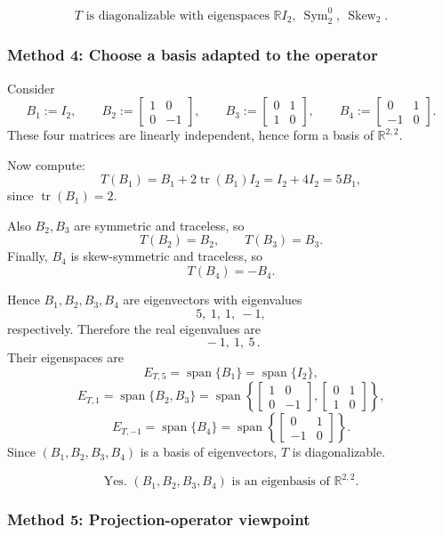 \documentclass[12pt]{article}
\newcommand{\R}{\mathbb{R}}
\newcommand{\Span}{\operatorname{span}}
\DeclareMathOperator{\tr}{tr}
\DeclareMathOperator{\Sym}{Sym}     %
\DeclareMathOperator{\Skew}{Skew}   %
\begin{document}
\[
\boxed{\,\text{$T$ is diagonalizable with eigenspaces } \R I_2,\ \Sym_2^0,\ \Skew_2.\,}
\]

\newpage
\subsubsection{Method 4: Choose a basis adapted to the operator}

Consider
\[
B_1:=I_2,\qquad
B_2:=\begin{bmatrix}1&0\\0&-1\end{bmatrix},\qquad
B_3:=\begin{bmatrix}0&1\\1&0\end{bmatrix},\qquad
B_4:=\begin{bmatrix}0&1\\-1&0\end{bmatrix}.
\]
These four matrices are linearly independent, hence form a basis of $\R^{2,2}$.

Now compute:
\[
T(B_1)=B_1+2\tr(B_1)I_2=I_2+4I_2=5B_1,
\]
since \(\tr(B_1)=2\).

Also \(B_2,B_3\) are symmetric and traceless, so
\[
T(B_2)=B_2,\qquad T(B_3)=B_3.
\]
Finally, \(B_4\) is skew-symmetric and traceless, so
\[
T(B_4)=-B_4.
\]

Hence \(B_1,B_2,B_3,B_4\) are eigenvectors with eigenvalues
\[
5,\ 1,\ 1,\ -1,
\]
respectively. Therefore the real eigenvalues are
\[
\boxed{\, -1,\ 1,\ 5 \, }.
\]
Their eigenspaces are
\[
E_{T,5}=\Span\{B_1\}=\Span\{I_2\},
\]
\[
E_{T,1}=\Span\{B_2,B_3\}
=
\Span\!\left\{
\begin{bmatrix}1&0\\0&-1\end{bmatrix},
\begin{bmatrix}0&1\\1&0\end{bmatrix}
\right\},
\]
\[
E_{T,-1}=\Span\{B_4\}
=
\Span\!\left\{
\begin{bmatrix}0&1\\-1&0\end{bmatrix}
\right\}.
\]
Since \((B_1,B_2,B_3,B_4)\) is a basis of eigenvectors, \(T\) is diagonalizable.

\[
\boxed{\,\text{Yes. } (B_1,B_2,B_3,B_4) \text{ is an eigenbasis of } \R^{2,2}. \,}
\]

\newpage
\subsubsection{Method 5: Projection-operator viewpoint}
\end{document}
